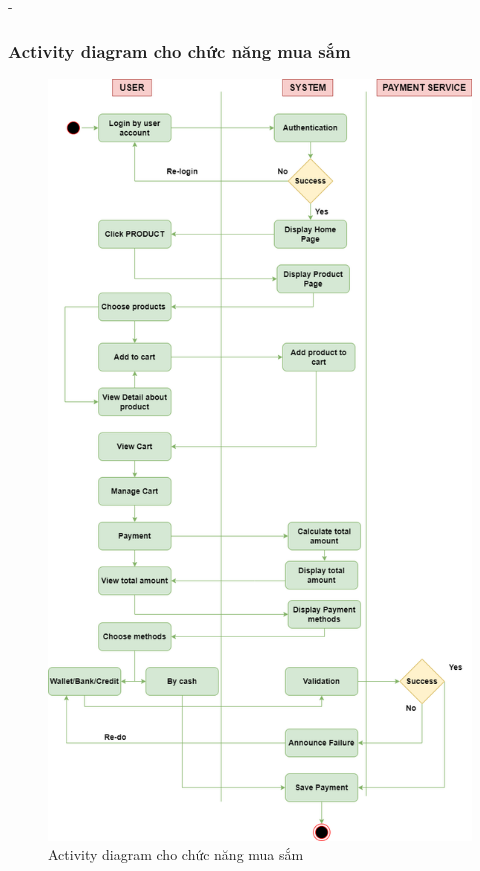 \begin {list} {-}{}
\subsubsection{Activity diagram cho chức năng mua sắm}
\begin{figure}[H]
    \centering
    \includegraphics[scale=0.4]{images/hieu/chap-3/shopping-activity-diagram.png}
    \caption{Activity diagram cho chức năng mua sắm}
\end{figure}
\newpage

\end{list}
